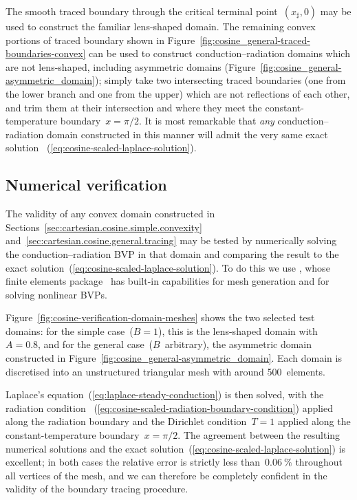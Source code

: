 The smooth traced boundary through the critical terminal point~$(x_\sharp, 0)$
may be used to construct the familiar lens-shaped domain.
The remaining convex portions of traced boundary
shown in Figure~\ref{fig:cosine_general-traced-boundaries-convex}
can be used to construct conduction--radiation domains
which are not lens-shaped, including asymmetric domains
(Figure~\ref{fig:cosine_general-asymmetric_domain});
simply take two intersecting traced boundaries
(one from the lower branch and one from the upper)
which are not reflections of each other,
and trim them at their intersection
and where they meet the constant-temperature boundary~$x = \pi/2$.
It is most remarkable that
\emph{any} conduction--radiation domain constructed in this manner
will admit the very same exact solution~%
  (\ref{eq:cosine-scaled-laplace-solution}).

\subsection{Numerical verification}
\label{sec:cartesian.cosine.verification}

The validity of any convex domain constructed
in Sections~\ref{sec:cartesian.cosine.simple.convexity}
and~\ref{sec:cartesian.cosine.general.tracing}
may be tested by numerically solving the conduction--radiation BVP
in that domain and comparing the result
to the exact solution~(\ref{eq:cosine-scaled-laplace-solution}).
To do this we use ,
whose finite elements package~
has built-in capabilities for mesh generation and for solving nonlinear BVPs.

\begin{figure}
\end{figure}

Figure~\ref{fig:cosine-verification-domain-meshes}
shows the two selected test domains:
for the simple case~($B = 1$),
this is the lens-shaped domain with~$A = 0.8$,
and for the general case~($B$~arbitrary),
the asymmetric domain constructed
in Figure~\ref{fig:cosine_general-asymmetric_domain}.
Each domain is discretised into an unstructured triangular mesh
with around 500~elements.

Laplace's equation~(\ref{eq:laplace-steady-conduction}) is then solved,
with the radiation condition~%
  (\ref{eq:cosine-scaled-radiation-boundary-condition})
applied along the radiation boundary
and the Dirichlet condition~$T = 1$ applied
along the constant-temperature boundary~$x = \pi/2$.
The agreement between the resulting numerical solutions
and the exact solution~(\ref{eq:cosine-scaled-laplace-solution})
is excellent;
in both cases the relative error is strictly less than~$\SI{0.06}{\percent}$
throughout all vertices of the mesh,
and we can therefore be completely confident
in the validity of the boundary tracing procedure.

